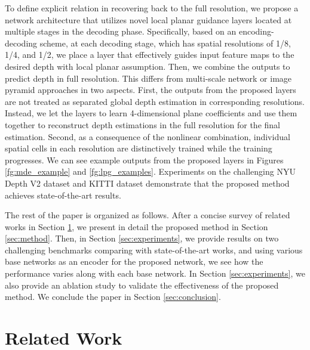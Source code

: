 \documentclass[10pt,twocolumn,letterpaper]{article}
\begin{document}
To define explicit relation in recovering back to the full resolution, we propose a network architecture that utilizes novel local planar guidance layers located at multiple stages in the decoding phase.
Specifically, based on an encoding-decoding scheme, at each decoding stage, which has spatial resolutions of 1/8, 1/4, and 1/2, we place a layer that effectively guides input feature maps to the desired depth with local planar assumption.
Then, we combine the outputs to predict depth in full resolution.
This differs from multi-scale network \cite{eigen2015predicting,eigen2014depth} or image pyramid \cite{godard2017unsupervised} approaches in two aspects.
First, the outputs from the proposed layers are not treated as separated global depth estimation in corresponding resolutions.
Instead, we let the layers to learn 4-dimensional plane coefficients and use them together to reconstruct depth estimations in the full resolution for the final estimation.
Second, as a consequence of the nonlinear combination, individual spatial cells in each resolution are distinctively trained while the training progresses.
We can see example outputs from the proposed layers in Figures \ref{fg:mde_example} and \ref{fg:lpg_examples}.
Experiments on the challenging NYU Depth V2 dataset \cite{silberman2012indoor} and KITTI dataset \cite{geiger2013vision} demonstrate that the proposed method achieves state-of-the-art results.

The rest of the paper is organized as follows.
After a concise survey of related works in Section \ref{sec:related_work}, we present in detail the proposed method in Section \ref{sec:method}.
Then, in Section \ref{sec:experiments}, we provide results on two challenging benchmarks comparing with state-of-the-art works, and using various base networks as an encoder for the proposed network, we see how the performance varies along with each base network.
In Section \ref{sec:experiments}, we also provide an ablation study to validate the effectiveness of the proposed method.
We conclude the paper in Section \ref{sec:conclusion}.

\section{Related Work}
\label{sec:related_work}
\end{document}
